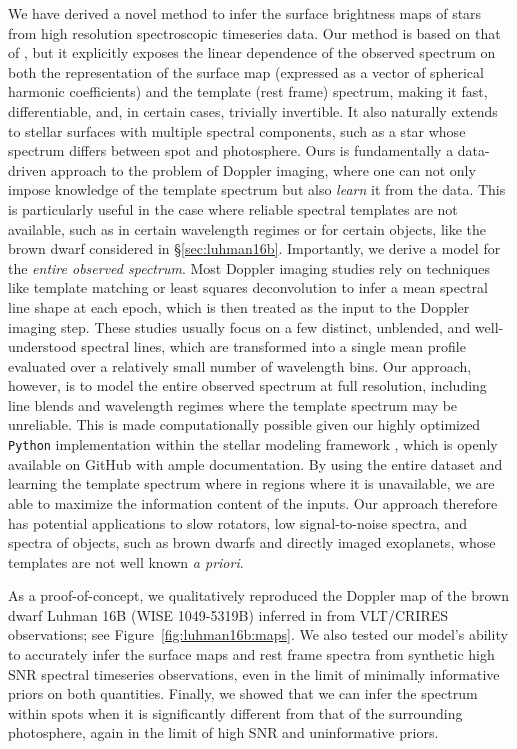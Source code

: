 \documentclass[modern]{aastex631}
\begin{document}
We have derived a novel method to infer the surface brightness maps of stars from high resolution spectroscopic timeseries data.
Our method is based on that of \citet{Vogt1987}, but it explicitly exposes the linear dependence of the observed spectrum on both the representation of the surface map (expressed as a vector of spherical harmonic coefficients) and the template (rest frame) spectrum, making it fast, differentiable, and, in certain cases, trivially invertible.
It also naturally extends to stellar surfaces with multiple spectral components, such as a star whose spectrum differs between spot and photosphere.
Ours is fundamentally a data-driven approach to the problem of Doppler imaging, where one can not only impose knowledge of the template spectrum but also \emph{learn} it from the data.
This is particularly useful in the case where reliable spectral templates are not available, such as in certain wavelength regimes or for certain objects, like the brown dwarf considered in \S\ref{sec:luhman16b}.
Importantly, we derive a model for the \emph{entire observed spectrum}.
Most Doppler imaging studies rely on techniques like template matching  or least squares deconvolution \citep[LSD;][]{Donati1997} to infer a mean spectral line shape at each epoch, which is then treated as the input to the Doppler imaging step.
These studies usually focus on a few distinct, unblended, and well-understood spectral lines, which are transformed into a single mean profile evaluated over a relatively small number of wavelength bins.
Our approach, however, is to model the entire observed spectrum at full resolution, including line blends and wavelength regimes where the template spectrum may be unreliable.
This is made computationally possible given our highly optimized \texttt{Python} implementation within the \starry stellar modeling framework \citep{Luger2019}, which is openly available on GitHub with ample documentation.
By using the entire dataset and learning the template spectrum where in regions where it is unavailable, we are able to maximize the information content of the inputs.
Our approach therefore has potential applications to slow rotators, low signal-to-noise spectra, and spectra of objects, such as brown dwarfs and directly imaged exoplanets, whose templates are not well known \emph{a priori}.

As a proof-of-concept, we qualitatively reproduced the Doppler map of the brown dwarf Luhman 16B (WISE 1049-5319B) inferred in \citet{Crossfield2014} from VLT/CRIRES observations; see Figure~\ref{fig:luhman16b:maps}.
We also tested our model's ability to accurately infer the surface maps and rest frame spectra from synthetic high SNR spectral timeseries observations, even in the limit of minimally informative priors on both quantities. 
Finally, we showed that we can infer the spectrum within spots when it is significantly different from that of the surrounding photosphere, again in the limit of high SNR and uninformative priors.
\end{document}

